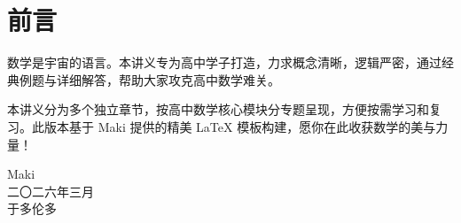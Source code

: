 \documentclass[a4paper,12pt,oneside,fontset=none]{ctexbook}
\begin{document}
\frontmatter

\MakeTitlePage

\chapter*{前言}

数学是宇宙的语言。本讲义专为高中学子打造，力求概念清晰，逻辑严密，通过经典例题与详细解答，帮助大家攻克高中数学难关。

本讲义分为多个独立章节，按高中数学核心模块分专题呈现，方便按需学习和复习。此版本基于 Maki 提供的精美 LaTeX 模板构建，愿你在此收获数学的美与力量！

\vspace{3cm}
\hfill
\begin{minipage}{5cm}
    \centering
    Maki \\
    二〇二六年三月\\
    于多伦多
\end{minipage}

\tableofcontents

\mainmatter













\end{document}
